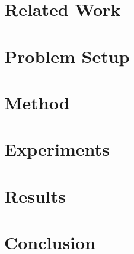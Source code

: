 \documentclass{article}
\theoremstyle{plain}
\theoremstyle{definition}
\theoremstyle{remark}
\begin{document}
\section{Related Work}


\section{Problem Setup}
\label{sec:problem-setup}


\section{Method}
\label{sec:method}


\section{Experiments}
\label{sec:experiments}


\section{Results}
\label{sec:results}


\section{Conclusion}


\end{document}
